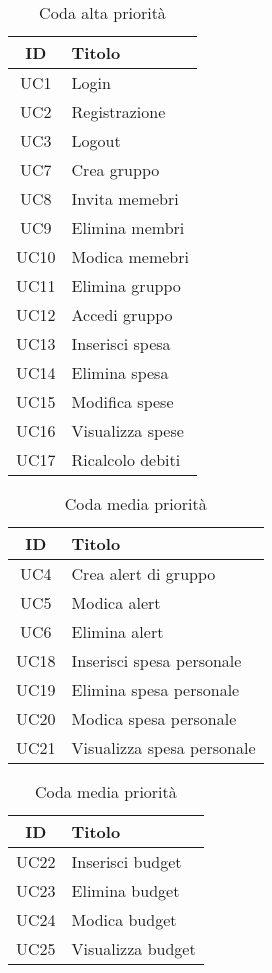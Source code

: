     \begin{table}[h]
        \centering
        \begin{tabular}{|c|l|}
        \hline
        \textbf{ID} & \textbf{Titolo} \\ \hline
        UC1 & Login\\ \hline
        UC2 & Registrazione \\ \hline
        UC3 & Logout \\ \hline
        UC7 & Crea gruppo \\ \hline
        UC8 & Invita memebri \\ \hline
        UC9 & Elimina membri \\ \hline
        UC10 & Modica memebri \\ \hline
        UC11 & Elimina gruppo \\ \hline
        UC12 & Accedi gruppo \\ \hline
        UC13 & Inserisci spesa \\ \hline
        UC14 & Elimina spesa \\ \hline
        UC15 & Modifica spese \\ \hline
        UC16 & Visualizza spese \\ \hline
        UC17 & Ricalcolo debiti \\ \hline
        \end{tabular}
        \caption{Coda alta priorità}
    \end{table}

    \begin{table}[h]
        \centering
        \begin{tabular}{|c|l|}
        \hline
        \textbf{ID} & \textbf{Titolo} \\ \hline
        UC4 & Crea alert di gruppo\\ \hline
        UC5 & Modica alert \\ \hline
        UC6 & Elimina alert \\ \hline
        UC18 & Inserisci spesa personale \\ \hline
        UC19 & Elimina spesa personale \\ \hline
        UC20 & Modica spesa personale \\ \hline
        UC21 & Visualizza spesa personale \\ \hline
        \end{tabular}
        \caption{Coda media priorità}
    \end{table}

    \begin{table}[h]
        \centering
        \begin{tabular}{|c|l|}
        \hline
        \textbf{ID} & \textbf{Titolo} \\ \hline
        UC22 & Inserisci budget\\ \hline
        UC23 & Elimina budget \\ \hline
        UC24 & Modica budget \\ \hline
        UC25 & Visualizza budget \\ \hline
        \end{tabular}
        \caption{Coda media priorità}
    \end{table}


